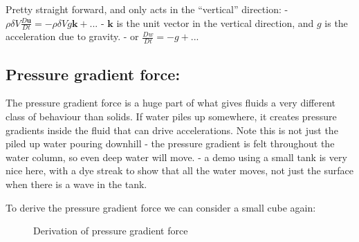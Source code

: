 Pretty straight forward, and only acts in the ``vertical'' direction: -
\(\rho \delta V \frac{D\mathbf{u}}{Dt} = -\rho \delta V g \mathbf{k} + ...\)
- \(\mathbf{k}\) is the unit vector in the vertical direction, and \(g\)
is the acceleration due to gravity. - or \(\frac{Dw}{Dt} = -g + ...\)

\subsection{Pressure gradient force:}\label{pressure-gradient-force}

The pressure gradient force is a huge part of what gives fluids a very
different class of behaviour than solids. If water piles up somewhere,
it creates pressure gradients inside the fluid that can drive
accelerations. Note this is not just the piled up water pouring downhill
- the pressure gradient is felt throughout the water column, so even
deep water will move. - a demo using a small tank is very nice here,
with a dye streak to show that all the water moves, not just the surface
when there is a wave in the tank.

To derive the pressure gradient force we can consider a small cube
again:

\begin{figure}
\centering
{}
\caption{Derivation of pressure gradient force}
\end{figure}

